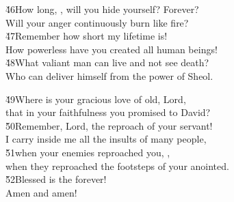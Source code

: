 \begin{poetry}
\poeml \v{46}How long, , will you hide yourself? Forever? \\
\poemll    Will your anger continuously burn like fire? \\
\poeml \v{47}Remember how short my lifetime is! \\
\poemll    How powerless have you created all human beings! \\
\poeml \v{48}What valiant man can live and not see death? \\
\poemll    Who can deliver himself from the power of Sheol.
\end{poetry}

\begin{poetry}
\poeml \v{49}Where is your gracious love of old, Lord, \\
\poemll    that in your faithfulness you promised to David? \\
\poeml \v{50}Remember, Lord, the reproach of your servant! \\
\poemll    I carry inside me all the insults of many people, \\
\poeml \v{51}when your enemies reproached you, , \\
\poemll    when they reproached the footsteps of your anointed. \\
\poeml \v{52}Blessed is the  forever! \\
\poemll    Amen and amen!
\end{poetry}

